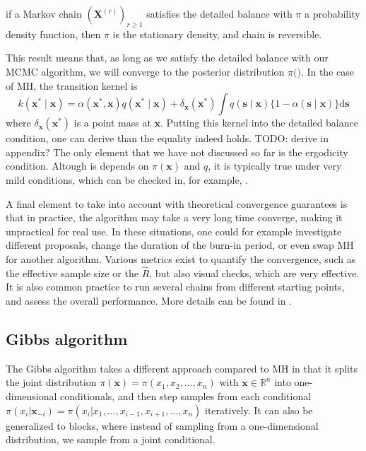 \documentclass[12pt]{memoir}
\newcommand{\mb}{\mathbf}
\begin{document}
\begin{boxedthm}
    if a Markov chain $(\mb X^{(r)})_{r\geq1}$ satisfies the detailed balance with $\pi$ a probability density function, then $\pi$ is the stationary density, and chain is reversible.
\end{boxedthm}

This result means that, as long as we satisfy the detailed balance with our MCMC algorithm, we will converge to the posterior distribution $\pi(\mb)$. In the case of MH, the transition kernel is 
\begin{equation}
    k\left(\boldsymbol{x}^* \mid \boldsymbol{x}\right)=\alpha\left(\boldsymbol{x}^*, \boldsymbol{x}\right) q\left(\boldsymbol{x}^* \mid \boldsymbol{x}\right)+\delta_{\boldsymbol{x}}\left(\boldsymbol{x}^*\right) \int q(\boldsymbol{s} \mid \boldsymbol{x})\{1-\alpha(\boldsymbol{s} \mid \boldsymbol{x})\} \mathrm{d} \boldsymbol{s}
\end{equation}
where $\delta_{\mb x}(\mb x^*)$ is a point mass at $\mb x$. Putting this kernel into the detailed balance condition, one can derive than the equality indeed holds. TODO: derive in appendix? The only element that we have not discussed so far is the ergodicity condition. Altough is depends on $\pi(\mb x)$ and $q$, it is typically true under very mild conditions, which can be checked in, for example, \cite{mcmc:RobertCasella2004}.\medbreak

A final element to take into account with theoretical convergence guarantees is that in practice, the algorithm may take a very long time converge, making it unpractical for real use. In these situations, one could for example investigate different proposals, change the duration of the burn-in period, or even swap MH for another algorithm. Various metrics exist to quantify the convergence, such as the effective sample size or the $\hat R$, but also visual checks, which are very effective. It is also common practice to run several chains from different starting points, and assess the overall performance. More details can be found in \cite{mcmc:gelman2013bayesian}.

\subsection{Gibbs algorithm}
The Gibbs algorithm takes a different approach compared to MH in that it splits the joint distribution $\pi(\mb x) = \pi(x_1, x_2, \dots, x_n)$ with $\mb x \in \mathbb{R}^n$ into one-dimensional conditionals, and then step samples from each conditional $\pi(x_i|\mb x_{-i}) = \pi(x_i|x_1,\dots,  x_{i-1}, x_{i+1}, \dots, x_n)$ iteratively. It can also be generalized to blocks, where instead of sampling from a one-dimensional distribution, we sample from a joint conditional. \medbreak
\end{document}
